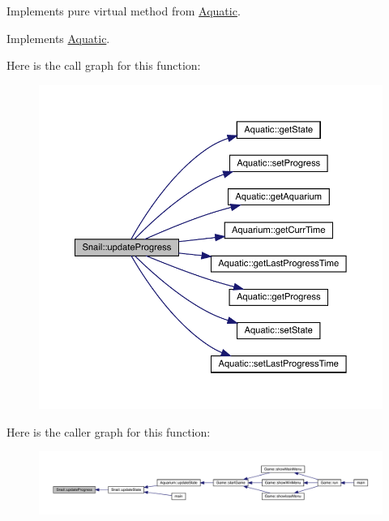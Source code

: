 Implements pure virtual method from \mbox{\hyperlink{class_aquatic}{Aquatic}}. 



Implements \mbox{\hyperlink{class_aquatic_ae1b6301ed27d6aadb73c7ee7879c24af}{Aquatic}}.

Here is the call graph for this function\+:\nopagebreak
\begin{figure}[H]
\begin{center}
\leavevmode
\includegraphics[width=350pt]{class_snail_a327c2d31017320c4cd18b48103905fa7_cgraph}
\end{center}
\end{figure}
Here is the caller graph for this function\+:
\nopagebreak
\begin{figure}[H]
\begin{center}
\leavevmode
\includegraphics[width=350pt]{class_snail_a327c2d31017320c4cd18b48103905fa7_icgraph}
\end{center}
\end{figure}
\mbox{\label{class_snail_a46dbefb10308c29341d96423e853cb2b}} 
